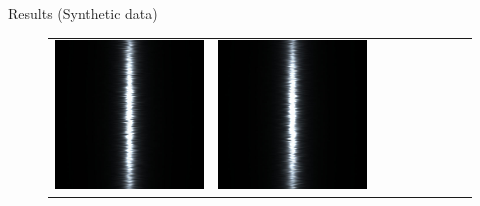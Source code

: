 \documentclass[final]{beamer}
\newlength{\twocolwid}
\newlength{\resultwidth}
\begin{document}
\begin{frame}[t]
\begin{columns}[t]
\begin{column}{\twocolwid}
\begin{block}{Results (Synthetic data)}
\begin{figure}[t]
\begin{tabular}{ccrclcccc}
            		\includegraphics[width=\resultwidth]{images/synth/metal/good3.jpg} &
            		\includegraphics[width=\resultwidth]{images/synth/metal/bad1.jpg}
            		\\

\end{tabular}
\end{figure}
\end{block}
\end{column}
\end{columns}
\end{frame}
\end{document}
